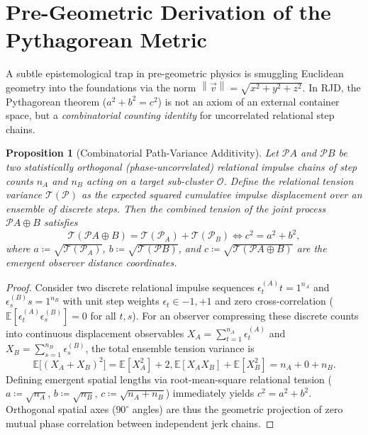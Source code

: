 \documentclass[11pt,a4paper]{article}
\theoremstyle{plain}
\newtheorem{proposition}[theorem]{Proposition}
\theoremstyle{definition}
\theoremstyle{remark}
\newcommand{\norm}[1]{\left\lVert #1 \right\rVert}
\begin{document}
\section{Pre-Geometric Derivation of the Pythagorean Metric}
\label{app:pythagoras}

A subtle epistemological trap in pre-geometric physics is smuggling Euclidean geometry into the foundations via the norm $\norm{\vec{v}} = \sqrt{x^2 + y^2 + z^2}$. In RJD, the Pythagorean theorem ($a^2 + b^2 = c^2$) is not an axiom of an external container space, but a \emph{combinatorial counting identity} for uncorrelated relational step chains.

\begin{proposition}[Combinatorial Path-Variance Additivity]
\label{prop:pythagoras}
Let $\mathcal{P}A$ and $\mathcal{P}B$ be two statistically orthogonal (phase-uncorrelated) relational impulse chains of step counts $n_A$ and $n_B$ acting on a target sub-cluster $\mathcal{O}$. Define the relational tension variance $\mathcal{T}(\mathcal{P})$ as the expected squared cumulative impulse displacement over an ensemble of discrete steps. Then the combined tension of the joint process $\mathcal{P}{A \oplus B}$ satisfies
\begin{equation}
\mathcal{T}(\mathcal{P}{A \oplus B}) = \mathcal{T}(\mathcal{P}_A) + \mathcal{T}(\mathcal{P}_B) \iff c^2 = a^2 + b^2,
\end{equation}
where $a \coloneqq \sqrt{\mathcal{T}(\mathcal{P}_A)}$, $b \coloneqq \sqrt{\mathcal{T}(\mathcal{P}B)}$, and $c \coloneqq \sqrt{\mathcal{T}(\mathcal{P}{A \oplus B})}$ are the emergent observer distance coordinates.
\end{proposition}
\begin{proof}
Consider two discrete relational impulse sequences ${\epsilon_t^{(A)}}{t=1}^{n_A}$ and ${\epsilon_s^{(B)}}{s=1}^{n_B}$ with unit step weights $\epsilon_t \in {-1, +1}$ and zero cross-correlation ($\mathbb{E}[\epsilon_t^{(A)} \epsilon_s^{(B)}] = 0$ for all $t, s$). For an observer compressing these discrete counts into continuous displacement observables $X_A = \sum_{t=1}^{n_A} \epsilon_t^{(A)}$ and $X_B = \sum_{s=1}^{n_B} \epsilon_s^{(B)}$, the total ensemble tension variance is
\begin{equation}
\mathbb{E}\big[(X_A + X_B)^2\big] = \mathbb{E}[X_A^2] + 2,\mathbb{E}[X_A X_B] + \mathbb{E}[X_B^2] = n_A + 0 + n_B.
\end{equation}
Defining emergent spatial lengths via root-mean-square relational tension ($a \coloneqq \sqrt{n_A}$, $b \coloneqq \sqrt{n_B}$, $c \coloneqq \sqrt{n_A + n_B}$) immediately yields $c^2 = a^2 + b^2$. Orthogonal spatial axes ($90^\circ$ angles) are thus the geometric projection of zero mutual phase correlation between independent jerk chains.
\end{proof}
\end{document}
